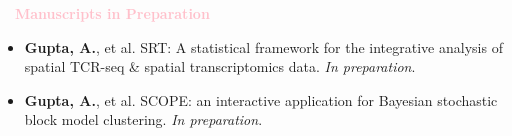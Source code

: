 \documentclass[11pt,a4paper,roman]{moderncv}        %
\begin{document}
\vskip 0.3cm
\textbf{\textcolor{pink}{\large{$\quad$Manuscripts in Preparation}}}
\vskip 0.2cm
\begin{itemize}
\item \textbf{Gupta, A.}, et al. SRT: A statistical framework for the integrative analysis of spatial TCR-seq \& spatial transcriptomics data. \textit{In preparation}.\par\vspace{5pt}
\item \textbf{Gupta, A.}, et al. SCOPE: an interactive application for Bayesian stochastic block model clustering. \textit{In preparation}.
\end{itemize}
\vspace{3pt}

\fussy
{}
\end{document}
